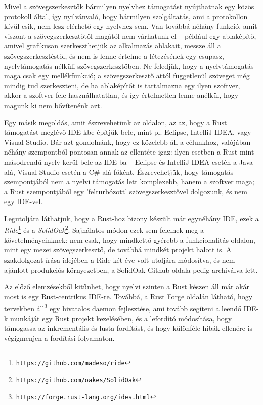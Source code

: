 Mivel a szövegszerkesztők bármilyen nyelvhez támogatást nyújthatnak egy közös protokoll által, így nyilvánvaló, hogy bármilyen szolgáltatás, ami a protokollon kívül esik, nem lesz elérhető egy nyelvhez sem. Van továbbá néhány funkció, amit viszont a szövegszerkesztőtől magától nem várhatunk el -- például egy ablaképítő, amivel gra\-fi\-ku\-san szerkeszthetjük az alkalmazás ablakait, messze áll a szövegszerkesztéstől, és nem is lenne értelme a létezésének egy csupasz, nyelvtámogatás nélküli szövegszerkesztőben. Ne feledjük, hogy a nyelvtámogatás maga csak egy mellékfunkció; a szövegszerkesztő attól függetlenül szöveget még mindig tud szerkeszteni, de ha ablaképítőt is tartalmazna egy ilyen szoftver, akkor a szoftver fele használhatatlan, és így értelmetlen lenne anélkül, hogy magunk ki nem bővítenénk azt.

Egy másik megoldás, amit észrevehetünk az oldalon, az az, hogy a Rust támogatást meglévő IDE-kbe építjük bele, mint pl. Eclipse, IntelliJ IDEA, vagy Visual Studio. Bár azt gondolnánk, hogy ez közelebb áll a célunkhoz, valójában néhány szempontból pontosan annak az ellentéte igaz: ilyen esetben a Rust mint másodrendű nyelv kerül bele az IDE-ba -- Eclipse és IntelliJ IDEA esetén a Java alá, Visual Studio esetén a C\# alá főként. Észrevehetjük, hogy támogatás szempontjából nem a nyelvi támogatás lett komplexebb, hanem a szoftver maga; a Rust szempontjából egy 'felturbózott' szövegszerkesztővel dolgozunk, és nem egy IDE-vel.

Legutoljára láthatjuk, hogy a Rust-hoz bizony készült már egynéhány IDE, ezek a \emph{Ride}\footnote{\texttt{https://github.com/madeso/ride}} és a \emph{SolidOak}\footnote{\texttt{https://github.com/oakes/SolidOak}}. Sajnálatos módon ezek sem felelnek meg a követelményeinknek: nem csak, hogy mindkettő gyérebb a funkcionalitás oldalon, mint egy mezei szö\-veg\-szer\-kesz\-tő, de továbbá mindkét projekt halott is. A szakdolgozat írása idejében a Ride két éve volt utoljára módosítva, és nem ajánlott produkciós környezetben, a SolidOak Github oldala pedig archiválva lett.


Az előző elemzésekből kitűnhet, hogy nyelvi szinten a Rust készen áll már akár most is egy Rust-centrikus IDE-re. Továbbá, a Rust Forge oldalán látható, hogy tervekben áll\footnote{\texttt{https://forge.rust-lang.org/ides.html}} egy hivatalos daemon fejlesztése, ami tovább segíteni a leendő IDE-k munkáját egy Rust projekt kezelésében, és a lefordító módosítása, hogy támogassa az inkrementális és lusta fordítást, és hogy különféle hibák ellenére is végigmenjen a fordítási folyamaton.

